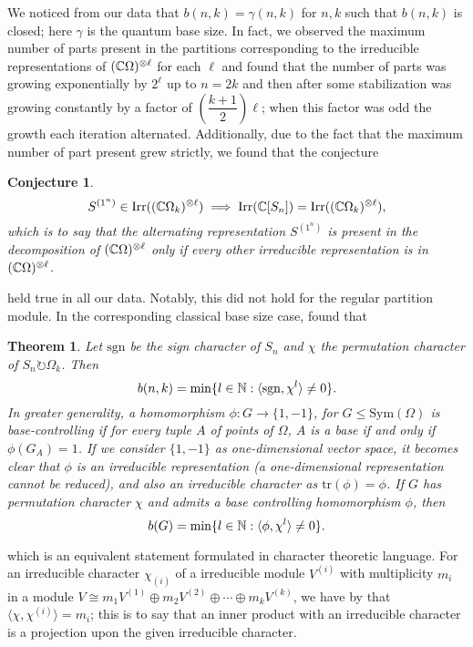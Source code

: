 \documentclass[12pt,twoside]{reedthesis}
\theoremstyle{plain}   %
\newtheorem{thm}{Theorem}[section] %
\newtheorem{conj}{Conjecture}[section]
\theoremstyle{definition}
\theoremstyle{remark}
\numberwithin{equation}{section}
\def\tr{\mathrm{tr}}
\def\irr{\mathrm{Irr}}
\def\acts{\circlearrowright} %
\begin{document}
We noticed from our data that $b(n,k) = \gamma(n,k)$ for $n,k$ such that $b(n,k)$ is closed; here $\gamma$ is the quantum base size.
In fact, we observed the maximum number of parts present in the partitions corresponding to the irreducible representations of $(\mathbb{C} \Omega)^{\otimes \ell}$ for each $\ell$ and found that the number
of parts was growing exponentially by $2^\ell$ up to $n = 2k$ and then after some stabilization was growing constantly by a factor of $(\dfrac{k+1}{2})\ell$; when this factor was odd the growth each iteration alternated.
Additionally, due to the fact that the maximum number of part present grew strictly, we found that the conjecture
\begin{conj}
  \[S^{(1^n)} \in \irr((\CC \Omega_k)^{\otimes \ell}) \implies \irr(\CC [S_n]) = \irr((\CC \Omega_k)^{\otimes \ell}),\]
  which is to say that the alternating representation $S^{(1^n)}$ is present in the decomposition of $(\mathbb{C} \Omega)^{\otimes \ell}$ only if every other irreducible representation is in $(\mathbb{C} \Omega)^{\otimes \ell}$.
\end{conj}
held true in all our data. Notably, this did not hold for the regular partition module.
In the corresponding classical base size case, \cite{valle24} found that
\begin{thm}
  Let $\mathrm{sgn}$ be the sign character of $S_n$ and $\chi$ the permutation character of $S_n \acts \Omega_k$. Then
  \[ b(n,k) = \min \{ l \in \mathbb{N}: \langle \mathrm{sgn}, \chi^l \rangle \neq 0 \}.\]
  In greater generality, a homomorphism $\phi: G \to \{1,-1\}$, for $G \leq \mathrm{Sym}(\Omega)$ is \emph{base-controlling} if for every tuple $A$ of points of $\Omega$, $A$ is a base if and only if $\phi(G_A) = 1$.
  If we consider $\{1,-1\}$ as one-dimensional vector space, it becomes clear that $\phi$ is an irreducible representation (a one-dimensional representation cannot be reduced), and also an irreducible character as $\tr(\phi) = \phi$.
  If $G$ has permutation character $\chi$ and admits a base controlling homomorphism $\phi$, then
  \[  b(G) = \min \{ l \in \mathbb{N}: \langle \phi, \chi^l \rangle \neq 0 \}.\]
\end{thm}
which is an equivalent statement formulated in character theoretic language.
For an irreducible character $\chi_{(i)}$ of a irreducible module $V^{(i)}$ with multiplicity $m_i$ in a module $V \cong m_1V^{(1)} \oplus m_2V^{(2)} \oplus \cdots \oplus m_kV^{(k)}$, we have by \cite[Cor. 1.9.4]{sagan}
that $\langle \chi, \chi^{(i)} \rangle = m_i$;
this is to say that an inner product with an irreducible character is a projection upon the given irreducible character.
\end{document}

